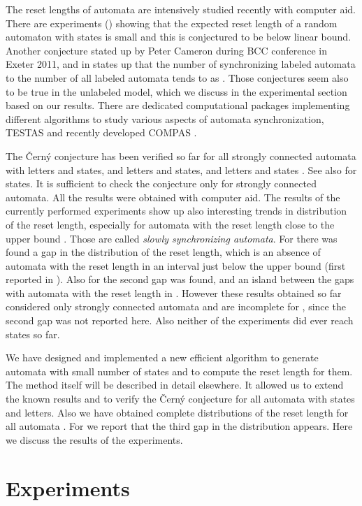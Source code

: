 \documentclass[runningheads,a4paper]{llncs}
\newcommand{\<}{\langle}
\renewcommand{\>}{\rangle}
\begin{document}
The reset lengths of automata are intensively studied recently with computer aid. There are experiments (\cite{Ro2009,ST2011}) showing that the expected reset length of a random automaton with  states is small and this is conjectured to be below linear bound. Another conjecture stated up by Peter Cameron during BCC conference in Exeter 2011, and in \cite{ST2011} states up that the number of synchronizing labeled automata to the number of all labeled automata tends to  as . Those conjectures seem also to be true in the unlabeled model, which we discuss in the experimental section based on our results. There are dedicated computational packages implementing different algorithms to study various aspects of automata synchronization, TESTAS \cite{Tr2003} and recently developed COMPAS \cite{CR2011}.

The \v{C}ern\'{y} conjecture has been verified so far for all strongly connected automata with  letters and  states, and  letters and  states, and  letters and  states \cite{Tr2006,Tr2011}. See also \cite{AGV2010} for  states. It is sufficient to check the conjecture only for strongly connected automata. All the results were obtained with computer aid. The results of the currently performed experiments show up also interesting trends in distribution of the reset length, especially for automata with the reset length close to the upper bound . Those are called \emph{slowly synchronizing automata}. For  there was found a gap in the distribution of the reset length, which is an absence of automata with the reset length in an interval just below the upper bound  (first reported in \cite{Tr2006}). Also for  the second gap was found, and an island between the gaps with automata with the reset length in  \cite{AGV2010}. However these results obtained so far considered only strongly connected automata and are incomplete for , since the second gap was not reported here. Also neither of the experiments did ever reach  states so far.

We have designed and implemented a new efficient algorithm to generate automata with small number of states and to compute the reset length for them. The method itself will be described in detail elsewhere. It allowed us to extend the known results and to verify the \v{C}ern\'{y} conjecture for all automata with  states and  letters. Also we have obtained complete distributions of the reset length for all automata . For  we report that the third gap in the distribution appears. Here we discuss the results of the experiments.

\section{Experiments}\label{sec:exp}
\end{document}
